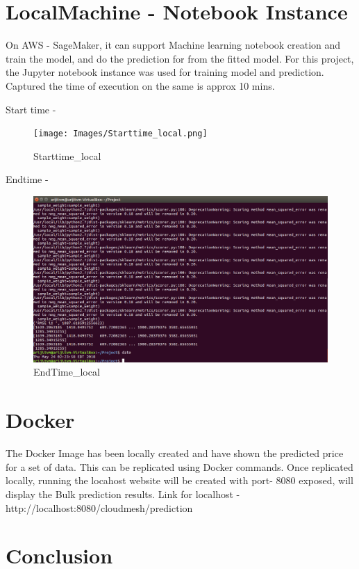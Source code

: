 \section{LocalMachine - Notebook Instance}

On AWS - SageMaker, it can support Machine learning notebook creation and 
train the model, and do the prediction for from the fitted model. For this 
project, the Jupyter notebook instance was used for training model and 
prediction. Captured the time of execution on the same is approx 10 mins.

Start time -
\begin{figure}[pic11]
	\centering\texttt{[image: Images/Starttime\_local.png]}
	\caption{Starttime_local}\label{fig:Starttime_local}
\end{figure}

Endtime - 
\begin{figure}[pic12]
	\centering\includegraphics[width=\columnwidth]{Images/EndTime_local.png}
	\caption{EndTime_local}\label{fig:EndTime_local}
\end{figure}

\section{Docker}

The Docker Image has been locally created and have shown the predicted 
price for a set of data. This can be replicated using Docker commands. 
Once replicated locally, running the locahost website will be created 
with port- 8080 exposed, will display the Bulk prediction results.
Link for localhost - http://localhost:8080/cloudmesh/prediction

\section{Conclusion}

